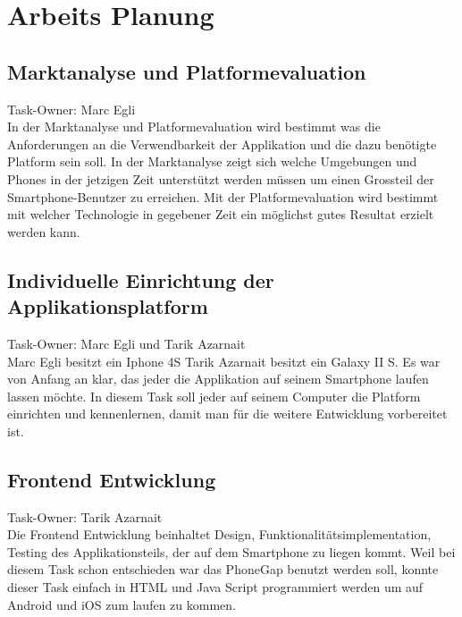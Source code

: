 
\newpage
\section{Arbeits Planung} %
\label{sec:arbeits_planung}

\subsection{Marktanalyse und Platformevaluation} %
\label{sub:marktanalyse_und_platformevaluation}
Task-Owner: Marc Egli\\
In der Marktanalyse und Platformevaluation wird bestimmt was die Anforderungen an die Verwendbarkeit der Applikation und die dazu benötigte Platform sein soll. In der Marktanalyse zeigt sich welche Umgebungen und Phones in der jetzigen Zeit unterstützt werden müssen um einen Grossteil der Smartphone-Benutzer zu erreichen. Mit der Platformevaluation wird bestimmt mit welcher Technologie in gegebener Zeit ein möglichst gutes Resultat erzielt werden kann.

\subsection{Individuelle Einrichtung der Applikationsplatform} %
\label{sub:individuelle_einrichtung_der_applikationsplatform}
Task-Owner: Marc Egli und Tarik Azarnait\\
Marc Egli besitzt ein Iphone 4S Tarik Azarnait besitzt ein Galaxy II S. Es war von Anfang an klar, das jeder die Applikation auf seinem Smartphone laufen lassen möchte. In diesem Task soll jeder auf seinem Computer die Platform einrichten und kennenlernen, damit man für die weitere Entwicklung vorbereitet ist. 

\subsection{Frontend Entwicklung} %
\label{sub:frontend_entwicklung}
Task-Owner: Tarik Azarnait\\
Die Frontend Entwicklung beinhaltet Design, Funktionalitätsimplementation, Testing des Applikationsteils, der auf dem Smartphone zu liegen kommt. Weil bei diesem Task schon entschieden war das PhoneGap benutzt werden soll, konnte dieser Task einfach in HTML und Java Script programmiert werden um auf Android und iOS zum laufen zu kommen. 

